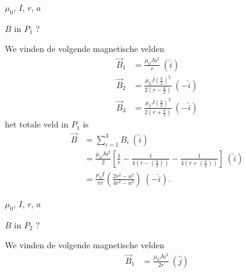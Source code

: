 \begin{enumerate}[leftmargin = 0cm,label = \subscript{P}{{\arabic*}}: ]
    \begin{minipage}[t]{.48\textwidth}
        \item 
        \begin{description}[labelwidth=1.5cm, leftmargin=!]
            \item[Geg. :]  $\mu_0$, $I$, $r$, $a$
            \item[Gevr. :] $B$ in $P_1$ ?
            \item[Opl. :]  
            We vinden de volgende magnetische velden
            \begin{align*}
                \vec{B}_1 
                    &= \frac{\mu_0Ja^2}{r} \ (\hat{i}) \\
                \vec{B}_2
                    &= \frac{\mu_0J(\frac{a}{2})^2}{2\left(r - \frac{a}{2}\right)} \ (-\hat{i}) \\
                \vec{B}_3 
                    &= \frac{\mu_0J(\frac{a}{2})^2}{2\left(r + \frac{a}{2}\right)} \ (-\hat{i})
            \end{align*}
            het totale veld in $P_1$ is
            \begin{align*}
                \vec{B} 
                    &= \sum_{i=1}^3 B_i \ (\hat{i}) \\
                    &= \frac{\mu_0Ja^2}{2} \left[\frac{1}{r} - \frac{1}{4\left(r - \left(\frac{a}{2}\right)\right)} - \frac{1}{4\left(r + \left(\frac{a}{2}\right)\right)} \right] \ (\hat{i}) \\
                    &= \frac{\mu_0I}{\pi r}\left(\frac{2r^2-a^2}{4r^2-a^2}\right) \ (-\hat{i}).
            \end{align*}
        \end{description}    
    \end{minipage}%
    \begin{minipage}[t]{.48\textwidth}
        \item 
        \begin{description}[labelwidth=1.5cm, leftmargin=!] 
            \item[Geg. :]  $\mu_0$, $I$, $r$, $a$
            \item[Gevr. :] $B$ in $P_2$ ?
            \item[Opl. :]  
            We vinden de volgende magnetische velden
            \begin{align*}
                \vec{B}_1 
                    &= \frac{\mu_0Ja^2}{2r} \ (\hat{j}) \\

\end{align*}
\end{description}
\end{minipage}
\end{enumerate}
